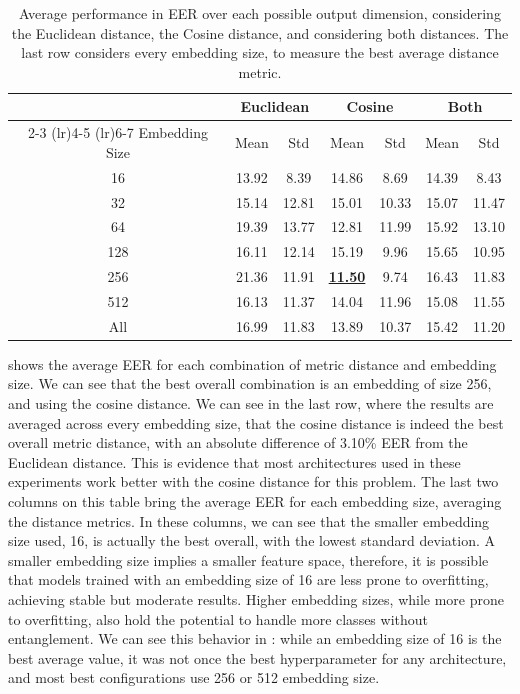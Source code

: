 \begin{table}[t!]
    \centering
    \caption{Average performance in \gls{EER} over each possible output dimension, considering the Euclidean distance, the Cosine distance, and considering both distances. The last row considers every embedding size, to measure the best average distance metric.}
    \label{tab:outdim_agg}
    \setlength{\tabcolsep}{4pt}
    \begin{tabular}{ccc|cc|cc}
    & \multicolumn{2}{c}{Euclidean} & \multicolumn{2}{c}{Cosine} & \multicolumn{2}{c}{Both} \\
    \cmidrule(lr){2-3} \cmidrule(lr){4-5} \cmidrule(lr){6-7}
    Embedding Size & Mean & Std & Mean & Std & Mean & Std \\
    \midrule
    16  & 13.92 & 8.39 & 14.86 & 8.69 & 14.39 & 8.43 \\
    32  & 15.14 & 12.81 & 15.01 & 10.33 & 15.07 & 11.47 \\
    64  & 19.39 & 13.77 & 12.81 & 11.99 & 15.92 & 13.10 \\
    128 & 16.11 & 12.14 & 15.19 & 9.96 & 15.65 & 10.95 \\
    256 & 21.36 & 11.91 & \underline{\textbf{11.50}} & 9.74 & 16.43 & 11.83 \\
    512 & 16.13 & 11.37 & 14.04 & 11.96 & 15.08 & 11.55 \\
    \midrule
    All & 16.99 & 11.83 & 13.89 & 10.37 & 15.42 & 11.20 \\
    \bottomrule
    \end{tabular}
\end{table}

 shows the average \gls{EER} for each combination of metric distance and embedding size. We can see that the best overall combination is an embedding of size 256, and using the cosine distance. We can see in the last row, where the results are averaged across every embedding size, that the cosine distance is indeed the best overall metric distance, with an absolute difference of 3.10\% \gls{EER} from the Euclidean distance. This is evidence that most architectures used in these experiments work better with the cosine distance for this problem. The last two columns on this table bring the average \gls{EER} for each embedding size, averaging the distance metrics. In these columns, we can see that the smaller embedding size used, 16, is actually the best overall, with the lowest standard deviation. A smaller embedding size implies a smaller feature space, therefore, it is possible that models trained with an embedding size of 16 are less prone to overfitting, achieving stable but moderate results. Higher embedding sizes, while more prone to overfitting, also hold the potential to handle more classes without entanglement. We can see this behavior in : while an embedding size of 16 is the best average value, it was not once the best hyperparameter for any architecture, and most best configurations use 256 or 512 embedding size.

